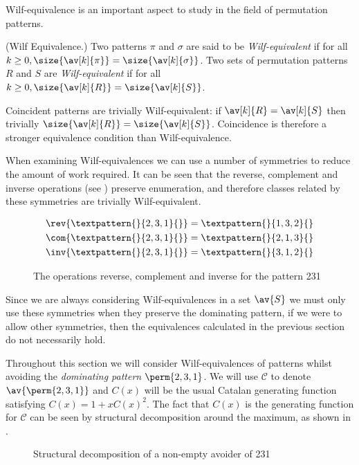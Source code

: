 Wilf-equivalence is an important aspect to study in the field of permutation
patterns.

\begin{definition}{(Wilf Equivalence.)}
  Two patterns \(\pi\) and \(\sigma\) are said to be \emph{Wilf-equivalent}
  if for all \(k\ge0, \size{\av[k]{\pi}} = \size{\av[k]{\sigma}}\). Two sets of
  permutation patterns \(R\) and \(S\) are \emph{Wilf-equivalent} if for all
  \(k\ge0, \size{\av[k]{R}} = \size{\av[k]{S}}\).
\end{definition}

Coincident patterns are trivially Wilf-equivalent: if \(\av[k]{R} = \av[k]{S}\)
then trivially \(\size{\av[k]{R}} = \size{\av[k]{S}}\). Coincidence is
therefore a stronger equivalence condition than Wilf-equivalence.

When examining Wilf-equivalences we can use a number of symmetries to reduce
the amount of work required. It can be seen that the reverse, complement
and inverse operations (see ) preserve enumeration, and
therefore classes related by these symmetries are trivially
Wilf-equivalent.
\begin{figure}[!htb]
\begin{align*}
    \rev{\textpattern{}{2,3,1}{}} &= \textpattern{}{1,3,2}{}\\
    \com{\textpattern{}{2,3,1}{}} &= \textpattern{}{2,1,3}{}\\
    \inv{\textpattern{}{2,3,1}{}} &= \textpattern{}{3,1,2}{}
\end{align*}
\caption{The operations reverse, complement and inverse for the pattern 231}
\label{fig:symm}
\end{figure}

Since we are always considering Wilf-equivalences in a set \(\av{S}\) we
must only use these symmetries when they preserve the dominating pattern, if we
were to allow other symmetries, then the equivalences calculated in the
previous section do not necessarily hold.

Throughout this section we will consider Wilf-equivalences of patterns
whilst avoiding the \emph{dominating pattern} \(\perm{2,3,1}\). We will
use \(\mathcal{C}\) to denote \(\av{\perm{2,3,1}}\) and \(C(x)\) will
be the usual Catalan generating function satisfying \(C(x) = 1 + xC(x)^2\).
The fact that \(C(x)\) is the generating function for \(\mathcal{C}\)
can be seen by structural decomposition around the maximum, as
shown in .

\begin{figure}[!ht]
    \centering
    \caption{Structural decomposition of a non-empty avoider of 231}
    \label{fig:decompmax}
\end{figure}

